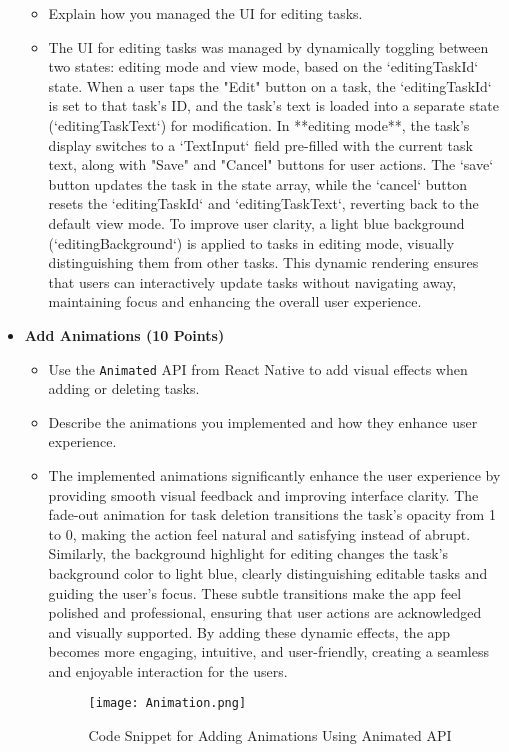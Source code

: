 \documentclass{article}
\begin{document}
\begin{itemize}
\begin{itemize}
        \item Explain how you managed the UI for editing tasks.
        \item The UI for editing tasks was managed by dynamically toggling between two states: editing mode and view mode, based on the `editingTaskId` state. When a user taps the "Edit" button on a task, the `editingTaskId` is set to that task's ID, and the task's text is loaded into a separate state (`editingTaskText`) for modification. In **editing mode**, the task's display switches to a `TextInput` field pre-filled with the current task text, along with "Save" and "Cancel" buttons for user actions. The `save` button updates the task in the state array, while the `cancel` button resets the `editingTaskId` and `editingTaskText`, reverting back to the default view mode. To improve user clarity, a light blue background (`editingBackground`) is applied to tasks in editing mode, visually distinguishing them from other tasks. This dynamic rendering ensures that users can interactively update tasks without navigating away, maintaining focus and enhancing the overall user experience.
    \end{itemize}
    
    \item \textbf{Add Animations (10 Points)}
    \begin{itemize}
        \item Use the \texttt{Animated} API from React Native to add visual effects when adding or deleting tasks.
        \item Describe the animations you implemented and how they enhance user experience.
             \item The implemented animations significantly enhance the user experience by providing smooth visual feedback and improving interface clarity. The fade-out animation for task deletion transitions the task's opacity from 1 to 0, making the action feel natural and satisfying instead of abrupt. Similarly, the background highlight for editing changes the task's background color to light blue, clearly distinguishing editable tasks and guiding the user's focus. These subtle transitions make the app feel polished and professional, ensuring that user actions are acknowledged and visually supported. By adding these dynamic effects, the app becomes more engaging, intuitive, and user-friendly, creating a seamless and enjoyable interaction for the users.
        \begin{figure}[H]
            \centering
            \texttt{[image: Animation.png]}
            \caption{Code Snippet for Adding Animations Using Animated API}
        \end{figure}
    \end{itemize}
\end{itemize}
\end{document}
